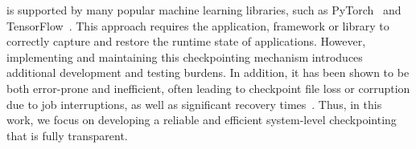  is supported by many popular machine learning libraries, such as PyTorch~\cite{paszke2019pytorch} and TensorFlow~\cite{abadi2016tensorflow}. This approach requires the application, framework or library to correctly capture and restore the runtime state of applications. However, implementing and maintaining this checkpointing mechanism introduces additional development and testing burdens. In addition, it has been shown to be both error-prone and inefficient, often leading to checkpoint file loss or corruption due to job interruptions, as well as significant recovery times~\cite{mohan2021checkfreq}. Thus, in this work, we focus on developing a reliable and efficient system-level checkpointing that is fully transparent.
